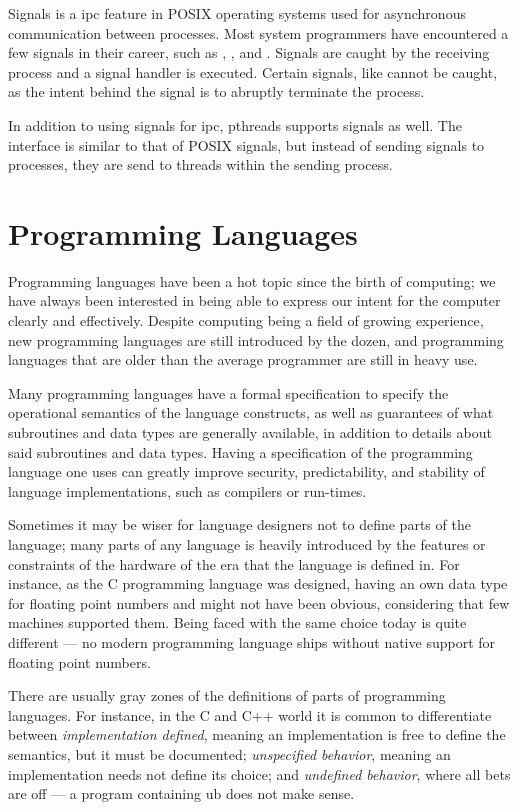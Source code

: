 Signals is a \gls{ipc} feature in POSIX operating systems used for asynchronous communication
between processes. Most system programmers have encountered a few signals in their career, such as
, ,  and . Signals are caught by the
receiving process and a signal handler is executed. Certain signals, like  cannot be
caught, as the intent behind the signal is to abruptly terminate the process.

In addition to using signals for \gls{ipc}, \gls{pthreads} supports signals as well. The interface
is similar to that of POSIX signals, but instead of sending signals to processes, they are send to
threads within the sending process.


\section{Programming Languages\label{sec:background-pl}}

Programming languages have been a hot topic since the birth of computing; we have always been
interested in being able to express our intent for the computer clearly and effectively. Despite
computing being a field of growing experience, new programming languages are still introduced by
the dozen, and programming languages that are older than the average programmer are still in heavy
use.

Many programming languages have a formal specification to specify the operational semantics of the
language constructs, as well as guarantees of what subroutines and data types are generally
available, in addition to details about said subroutines and data types. Having a specification of
the programming language one uses can greatly improve security, predictability, and stability of
language implementations, such as compilers or run-times.

Sometimes it may be wiser for language designers not to define parts of the language; many parts of
any language is heavily introduced by the features or constraints of the hardware of the era that
the language is defined in. For instance, as the C programming language was designed, having an own
data type for floating point numbers  and  might not have been obvious,
considering that few machines supported them. Being faced with the same choice today is quite
different --- no modern programming language ships without native support for floating point
numbers.

There are usually gray zones of the definitions of parts of programming languages. For instance, in
the C and C++ world it is common to differentiate between \emph{implementation defined}, meaning an
implementation is free to define the semantics, but it must be documented; \emph{unspecified
behavior}, meaning an implementation needs not define its choice; and \emph{undefined behavior},
where all bets are off --- a program containing \gls{ub} does not make sense.

